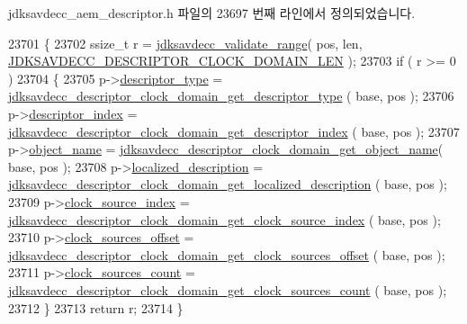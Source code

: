 jdksavdecc\+\_\+aem\+\_\+descriptor.\+h 파일의 23697 번째 라인에서 정의되었습니다.


\begin{DoxyCode}
23701 \{
23702     ssize\_t r = \hyperlink{group__util_ga9c02bdfe76c69163647c3196db7a73a1}{jdksavdecc\_validate\_range}( pos, len, 
      \hyperlink{group__descriptor__clock__domain_gab5413d6a262da98f3cc096cac6d47590}{JDKSAVDECC\_DESCRIPTOR\_CLOCK\_DOMAIN\_LEN} );
23703     \textcolor{keywordflow}{if} ( r >= 0 )
23704     \{
23705         p->\hyperlink{structjdksavdecc__descriptor__clock__domain_ab7c32b6c7131c13d4ea3b7ee2f09b78d}{descriptor\_type} = 
      \hyperlink{group__descriptor__clock__domain_gab5660321110c3f80925fbb8cf3a686c9}{jdksavdecc\_descriptor\_clock\_domain\_get\_descriptor\_type}
      ( base, pos );
23706         p->\hyperlink{structjdksavdecc__descriptor__clock__domain_a042bbc76d835b82d27c1932431ee38d4}{descriptor\_index} = 
      \hyperlink{group__descriptor__clock__domain_ga8de4e3c350af50630aa21b69890ea87e}{jdksavdecc\_descriptor\_clock\_domain\_get\_descriptor\_index}
      ( base, pos );
23707         p->\hyperlink{structjdksavdecc__descriptor__clock__domain_a7d1f5945a13863b1762fc6db74fa8f80}{object\_name} = 
      \hyperlink{group__descriptor__clock__domain_gaf64ca84e3bbb2c9f4592d07b0f4d817e}{jdksavdecc\_descriptor\_clock\_domain\_get\_object\_name}( base,
       pos );
23708         p->\hyperlink{structjdksavdecc__descriptor__clock__domain_a0926f846ca65a83ad5bb06b4aff8f408}{localized\_description} = 
      \hyperlink{group__descriptor__clock__domain_gab5efd01d176fcf2fa9ce3d28d18da8e6}{jdksavdecc\_descriptor\_clock\_domain\_get\_localized\_description}
      ( base, pos );
23709         p->\hyperlink{structjdksavdecc__descriptor__clock__domain_ae6d3717453951addecc331540f572e30}{clock\_source\_index} = 
      \hyperlink{group__descriptor__clock__domain_ga6a4c7b063da71aff1fe21915bd739d5e}{jdksavdecc\_descriptor\_clock\_domain\_get\_clock\_source\_index}
      ( base, pos );
23710         p->\hyperlink{structjdksavdecc__descriptor__clock__domain_a1f5c318297b1398ad46408ad6308245d}{clock\_sources\_offset} = 
      \hyperlink{group__descriptor__clock__domain_ga94e7b9934982cdf00b93bb6ad8942920}{jdksavdecc\_descriptor\_clock\_domain\_get\_clock\_sources\_offset}
      ( base, pos );
23711         p->\hyperlink{structjdksavdecc__descriptor__clock__domain_a7315787fca5771d39a38a39caa81a89e}{clock\_sources\_count} = 
      \hyperlink{group__descriptor__clock__domain_gab452e3985705f9a639b2557a752186f8}{jdksavdecc\_descriptor\_clock\_domain\_get\_clock\_sources\_count}
      ( base, pos );
23712     \}
23713     \textcolor{keywordflow}{return} r;
23714 \}
\end{DoxyCode}


